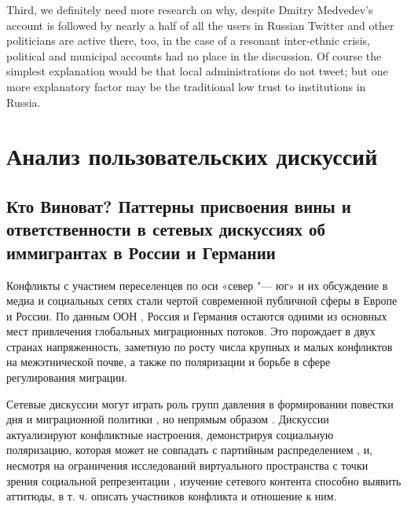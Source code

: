 Third, we definitely need more research on why, despite Dmitry Medvedev’s account is followed by nearly a half of all the users in Russian Twitter and other politicians are active there, too, in the case of a resonant inter-ethnic crisis, political and municipal accounts had no place in the discussion. Of course the simplest explanation would be that local administrations do not tweet; but one more explanatory factor may be the traditional low trust to institutions in Russia.

\section{Анализ пользовательских дискуссий}\label{sec:ch2/sec5}

\subsection{Кто Виноват? Паттерны присвоения вины и ответственности в сетевых дискуссиях об иммигрантах в России и Германии}\label{subsec:ch2/sec5/sub1}

Конфликты с участием переселенцев по оси «север "--- юг» и их обсуждение в медиа и социальных сетях стали чертой современной публичной сферы в Европе и России. По данным ООН \cite{UN2013}, Россия и Германия остаются одними из основных мест привлечения глобальных миграционных потоков. Это порождает в двух странах напряженность, заметную по росту числа крупных и малых конфликтов на межэтнической почве, а также по поляризации и борьбе в сфере регулирования миграции.

Сетевые дискуссии могут играть роль групп давления в формировании повестки дня и миграционной политики \cite{TrottierFuchs}, но непрямым образом \cite{Tufekci}. Дискуссии актуализируют конфликтные настроения, демонстрируя социальную поляризацию, которая может не совпадать с партийным распределением \cite{BodrunovaBlekanovSmoliarova}, и, несмотря на ограничения исследований виртуального пространства с точки зрения социальной репрезентации \cite{Daniels}, изучение сетевого контента способно выявить аттитюды, в т. ч. описать участников конфликта и отношение к ним.

